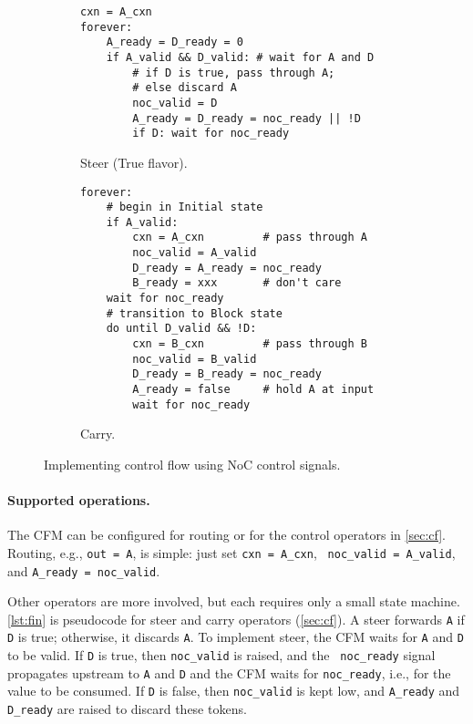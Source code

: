 \begin{figure}[t]
\begin{subfigure}{\linewidth}
\begin{lstlisting}[style=custompython]
cxn = A_cxn
forever:
    A_ready = D_ready = 0
    if A_valid && D_valid: # wait for A and D
        # if D is true, pass through A;
        # else discard A 
        noc_valid = D
        A_ready = D_ready = noc_ready || !D
        if D: wait for noc_ready
\end{lstlisting}
\caption{Steer (True flavor).}
\label{lst:fin:steer}
\end{subfigure}

\begin{subfigure}{\linewidth}
\begin{lstlisting}[style=custompython]
forever:
    # begin in Initial state
    if A_valid:
        cxn = A_cxn         # pass through A
        noc_valid = A_valid
        D_ready = A_ready = noc_ready
        B_ready = xxx       # don't care
    wait for noc_ready
    # transition to Block state
    do until D_valid && !D:
        cxn = B_cxn         # pass through B
        noc_valid = B_valid
        D_ready = B_ready = noc_ready
        A_ready = false     # hold A at input
        wait for noc_ready
\end{lstlisting}
\caption{Carry.}
\label{lst:fin:carry}
\end{subfigure}
  \caption{Implementing control flow using NoC control signals.}
  \label{lst:fin}
\end{figure}

\paragraph{Supported operations.}
The CFM can be configured for routing or for the control operators in
\autoref{sec:cf}.
%
Routing, e.g., {\tt out = A}, is simple: just set {\tt cxn = A\_cxn}, {\tt
noc\_valid = A\_valid}, and {\tt A\_ready = noc\_valid}.

Other operators are more involved, but each requires only a
small state machine.
%
\autoref{lst:fin} is pseudocode for steer and carry operators
(\autoref{sec:cf}).
%
A steer forwards {\tt A} if {\tt D} is true; otherwise,
it discards {\tt A}.
%
To implement steer, the CFM waits for {\tt A} and {\tt D}
to be valid.
%
If {\tt D} is true, then {\tt noc\_valid} is raised, and the {\tt
  noc\_ready} signal propagates upstream to {\tt A} and {\tt D}
and the CFM waits for {\tt noc\_ready}, i.e., for the value to be consumed.
%
If {\tt D} is false, then {\tt noc\_valid} is kept low, and
{\tt A\_ready} and {\tt D\_ready} are raised to discard these
tokens.

